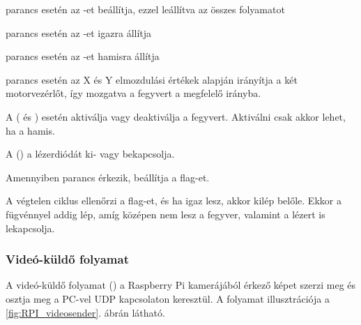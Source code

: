 \begin{list}{-}{}
	\item {} parancs esetén az -et beállítja, ezzel leállítva az összes folyamatot
	\item {} parancs esetén az -et igazra állítja
	\item {} parancs esetén az -et hamisra állítja
	\item {} parancs esetén az X és Y elmozdulási értékek alapján irányítja a két motorvezérlőt, így mozgatva a fegyvert a megfelelő irányba.
	\item A ( és ) esetén aktiválja vagy deaktiválja a fegyvert. Aktiválni csak akkor lehet, ha a  hamis.
	\item A () a lézerdiódát ki- vagy bekapcsolja.
	\item Amennyiben  parancs érkezik, beállítja a  flag-et.
\end{list}

A végtelen ciklus ellenőrzi a  flag-et, és ha igaz lesz, akkor kilép belőle. Ekkor a  fügvénnyel addig lép, amíg középen nem lesz a fegyver, valamint a lézert is lekapcsolja.


\subsubsection*{Videó-küldő folyamat}
A videó-küldő folyamat () a Raspberry Pi kamerájából érkező képet szerzi meg és osztja meg a PC-vel UDP kapcsolaton keresztül. A folyamat illusztrációja a \ref{fig:RPI_videosender}. ábrán látható.

